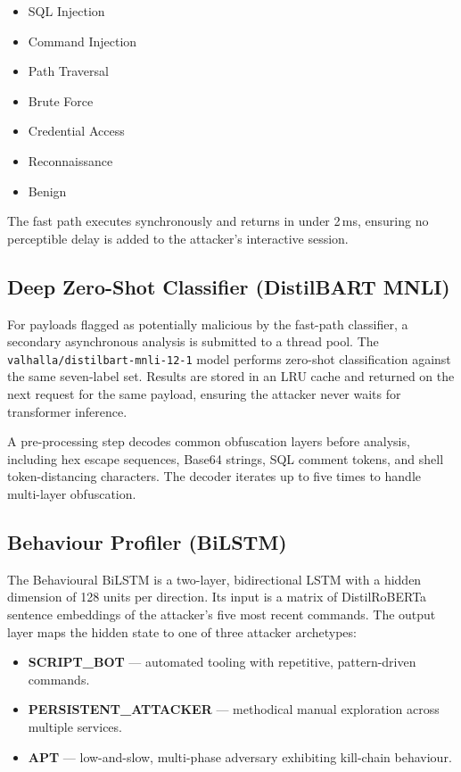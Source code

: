 \begin{itemize}
    \item SQL Injection
    \item Command Injection
    \item Path Traversal
    \item Brute Force
    \item Credential Access
    \item Reconnaissance
    \item Benign
\end{itemize}

The fast path executes synchronously and returns in under 2\,ms, ensuring no perceptible delay is added to the attacker's interactive session.

\subsection{Deep Zero-Shot Classifier (DistilBART MNLI)}

For payloads flagged as potentially malicious by the fast-path classifier, a secondary asynchronous analysis is submitted to a thread pool. The \texttt{valhalla/distilbart-mnli-12-1} model performs zero-shot classification against the same seven-label set. Results are stored in an LRU cache and returned on the next request for the same payload, ensuring the attacker never waits for transformer inference.

A pre-processing step decodes common obfuscation layers before analysis, including hex escape sequences, Base64 strings, \ac{SQL} comment tokens, and shell token-distancing characters. The decoder iterates up to five times to handle multi-layer obfuscation.

\subsection{Behaviour Profiler (BiLSTM)}

The Behavioural BiLSTM is a two-layer, bidirectional LSTM with a hidden dimension of 128 units per direction. Its input is a matrix of DistilRoBERTa sentence embeddings of the attacker's five most recent commands. The output layer maps the hidden state to one of three attacker archetypes:

\begin{itemize}
    \item \textbf{SCRIPT\_BOT} — automated tooling with repetitive, pattern-driven commands.
    \item \textbf{PERSISTENT\_ATTACKER} — methodical manual exploration across multiple services.
    \item \textbf{APT} — low-and-slow, multi-phase adversary exhibiting kill-chain behaviour.
\end{itemize}


